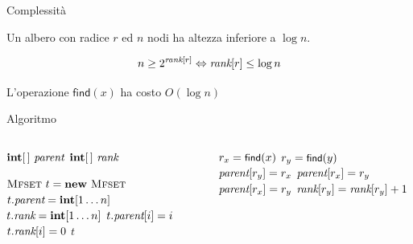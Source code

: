 \begin{frame}{Complessità}


\vspace{-9pt}
\begin{myboxtitle}[Corollario]
Un albero \mfset con radice $r$ ed $n$ nodi ha altezza inferiore a $\log n$.

\end{myboxtitle}

\begin{myboxtitle}[Dimostrazione]
\[
  n \geq 2^{\textit{rank}[r]} \Leftrightarrow \textit{rank}[r] \leq \log n
\]
\end{myboxtitle}

\begin{myboxtitle}[Complessità]
L'operazione $\textsf{find}(x)$ ha costo $O(\log n)$
\end{myboxtitle}


\end{frame}

\begin{frame}{Algoritmo}

\vspace{-15pt}
\begin{columns}[T]
\begin{Procedure}
\caption[T]{\mfset \phantom{\mfmerge($\INTEGER\ x, \INTEGER\ y$)}}	

$\INTEGER[\,]\ \mfparent$\;
$\INTEGER[\,]\ \mfrank$\;
\BlankLine

\mfset {}
{
  $\mfset\ t = \NEW\ \mfset$\;
  $t.\mfparent = \INTEGER[1 \mldots n]$\;
  $t.\mfrank = \INTEGER[1 \mldots n]$\;
  {
    $t.\textit{parent}[i] = i$\;
    $t.\textit{rank}[i] = 0$\;
  }
  \Return $t$\;
}
\end{Procedure}

\begin{Procedure}
\caption[A]{\mfmerge($\INTEGER\ x, \INTEGER\ y$)}
{
  $r_x = \textsf{{\small find}}(x)$\;
  $r_y = \textsf{{\small find}}(y)$\;
  {
    \uIf{$\mfrank[r_x] > \mfrank[r_y]$}
    {
      $\textit{parent}[r_y] = r_x$\;
    }
    \uElseIf{$\mfrank[r_y] > \mfrank[r_x]$}
    {
      $\textit{parent}[r_x] = r_y$\;
    }
    \Else
    {
      $\textit{parent}[r_x] = r_y$\;
      $\textit{rank}[r_y] = \textit{rank}[r_y]+1$
    }
  }
}
\end{Procedure}
\end{columns}

\end{frame}


